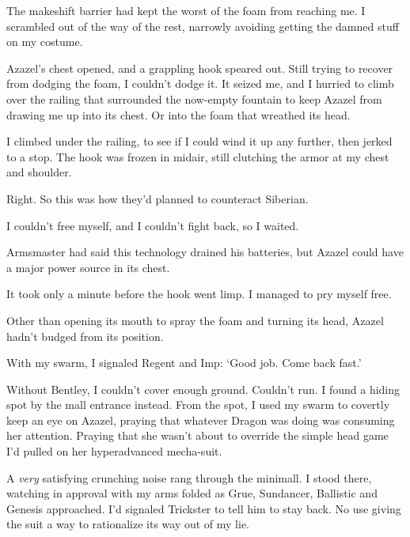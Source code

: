 The makeshift barrier had kept the worst of the foam from reaching me.  I scrambled out of the way of the rest, narrowly avoiding getting the damned stuff on my costume.



Azazel's chest opened, and a grappling hook speared out.  Still trying to recover from dodging the foam, I couldn't dodge it.  It seized me, and I hurried to climb over the railing that surrounded the now-empty fountain to keep Azazel from drawing me up into its chest.  Or into the foam that wreathed its head.



I climbed under the railing, to see if I could wind it up any further, then jerked to a stop.  The hook was frozen in midair, still clutching the armor at my chest and shoulder.



Right.  So this was how they'd planned to counteract Siberian.



I couldn't free myself, and I couldn't fight back, so I waited.



Armsmaster had said this technology drained his batteries, but Azazel could have a major power source in its chest.



It took only a minute before the hook went limp.  I managed to pry myself free.



Other than opening its mouth to spray the foam and turning its head, Azazel hadn't budged from its position.



With my swarm, I signaled Regent and Imp:  `Good job.  Come back fast.'



Without Bentley, I couldn't cover enough ground.  Couldn't run.  I found a hiding spot by the mall entrance instead.  From the spot, I used my swarm to covertly keep an eye on Azazel, praying that whatever Dragon was doing was consuming her attention.  Praying that she wasn't about to override the simple head game I'd pulled on her hyperadvanced mecha-suit.



\sectionbreak



A \emph{very} satisfying crunching noise rang through the minimall.  I stood there, watching in approval with my arms folded as Grue, Sundancer, Ballistic and Genesis approached.  I'd signaled Trickster to tell him to stay back.  No use giving the suit a way to rationalize its way out of my lie.



